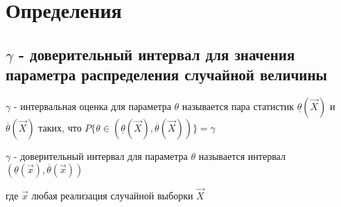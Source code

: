 \chapter{Определения}

\section{$\gamma$ - доверительный интервал для значения параметра распределения случайной величины}
$\gamma$ - интервальная оценка для параметра $\theta$ называется пара статистик $\underline{\theta}(\vec{X})$ и $\overline{\theta}(\vec{X})$ таких, что $P \{ \theta \in (\underline{\theta}(\vec{X}), \overline{\theta}(\vec{X})) \} = \gamma$

$\gamma$ - доверительный интервал для параметра $\theta$ называется интервал $(\underline{\theta}(\vec{x}), \overline{\theta}(\vec{x}))$

где $\vec{x}$ любая реализация случайной выборки $\vec{X}$
